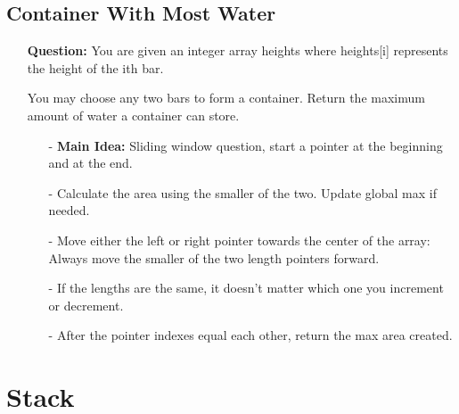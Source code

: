 \documentclass[12pt]{article}
\begin{document}
\subsection{Container With Most Water}
\begin{enumerate}
  \item[] \textbf{Question:} You are given an integer array heights where heights[i] represents the height of the ith bar.

You may choose any two bars to form a container. Return the maximum amount of water a container can store.

    \begin{enumerate}
      \item[-] \textbf{Main Idea: } Sliding window question, start a pointer at the beginning and at the end.
      \item[-] Calculate the area using the smaller of the two. Update global max if needed.
      \item[-] Move either the left or right pointer towards the center of the array: Always move the smaller of the two length pointers forward.
      \item[-] If the lengths are the same, it doesn't matter which one you increment or decrement. 
      \item[-] After the pointer indexes equal each other, return the max area created.
    \end{enumerate}
\end{enumerate}




\section{Stack}
\end{document}

